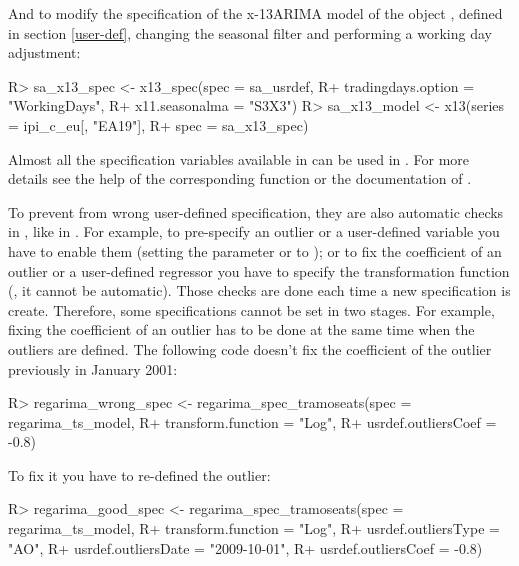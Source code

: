 \documentclass[article]{jss}
\begin{document}
And to modify the specification of the x-13ARIMA model of the object
, defined in section \ref{user-def}, changing the
seasonal filter and performing a working day adjustment:

\begin{CodeChunk}

\begin{CodeInput}
R> sa_x13_spec <- x13_spec(spec = sa_usrdef,
R+                          tradingdays.option = "WorkingDays",
R+                          x11.seasonalma = "S3X3")
R> sa_x13_model <- x13(series = ipi_c_eu[, "EA19"],
R+                     spec = sa_x13_spec)
\end{CodeInput}
\end{CodeChunk}

Almost all the specification variables available in 
can be used in . For more details see the help of the
corresponding function or the documentation of .

To prevent from wrong user-defined specification, they are also
automatic checks in , like in . For
example, to pre-specify an outlier or a user-defined variable you have
to enable them (setting the parameter  or
 to ); or to fix the coefficient of
an outlier or a user-defined regressor you have to specify the
transformation function (, it cannot be
automatic). Those checks are done each time a new specification is
create. Therefore, some specifications cannot be set in two stages. For
example, fixing the coefficient of an outlier has to be done at the same
time when the outliers are defined. The following code doesn't fix the
coefficient of the outlier previously in January 2001:

\begin{CodeChunk}

\begin{CodeInput}
R> regarima_wrong_spec <- regarima_spec_tramoseats(spec = regarima_ts_model,
R+              transform.function = "Log",
R+              usrdef.outliersCoef =  -0.8)
\end{CodeInput}
\end{CodeChunk}

To fix it you have to re-defined the outlier:

\begin{CodeChunk}

\begin{CodeInput}
R> regarima_good_spec <- regarima_spec_tramoseats(spec = regarima_ts_model,
R+              transform.function = "Log",
R+              usrdef.outliersType = "AO",
R+              usrdef.outliersDate = "2009-10-01",
R+              usrdef.outliersCoef =  -0.8)
\end{CodeInput}
\end{CodeChunk}
\end{document}
